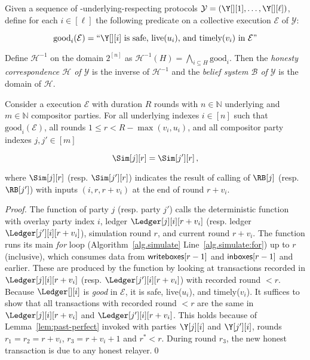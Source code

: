 \begin{definition}
  Given a sequence of \rollerblade-underlying-respecting
  protocols $\mathcal{Y} = (\Y[][1], \ldots, \Y[][\ell])$,
  define for each $i \in [\ell]$ the following predicate on
  a collective execution $\mathcal{E}$ of $\mathcal{Y}$:

  \[
    \text{good}_i(\mathcal{E}) = \text{``} \Y[][i] \text{ is safe, live$(u_i)$, and timely$(v_i)$ in $\mathcal{E}$''}
  \]

  Define $\mathcal{H}^{-1}$ on the domain $2^{[n]}$ as
  $\mathcal{H}^{-1}(H) = \bigwedge_{i \subseteq H} \text{good}_i$.
  Then the \emph{\rollerblade honesty correspondence $\mathcal{H}$ of $\mathcal{Y}$}
  is the inverse of $\mathcal{H}^{-1}$ and the \emph{\rollerblade belief system
  $\mathcal{B}$ of $\mathcal{Y}$} is the domain of $\mathcal{H}$.
\end{definition}

\begin{lemma}\label{lem:cross-party}
  Consider a \rollerblade execution $\mathcal{E}$ with duration $R$ rounds
  with $n \in \mathbb{N}$ underlying
  and $m \in \mathbb{N}$ compositor parties.
  For
  all underlying indexes $i \in [n]$ such that $\text{good}_i(\mathcal{E})$,
  all rounds $1 \leq r < R - \max(v_i, u_i)$,
  and
  all compositor party indexes $j, j' \in [m]$

  \[
    \Sim[j][r] = \Sim[j'][r]\,,
  \]

  where $\Sim[j][r]$ (resp. $\Sim[j'][r]$) indicates the result of calling
  \emulateMachine of $\RB[j]$ (resp. $\RB[j']$) with inputs
  $(i, r, r + v_i)$
  at the end of round $r + v_i$.
\end{lemma}
\begin{proof}
  The function \emulateMachine of party $j$ (resp. party $j'$)
  calls the deterministic function \simulate with overlay party index $i$,
  ledger $\Ledger[j][i][r + v_i]$ (resp. ledger $\Ledger[j'][i][r + v_i]$), simulation round
  $r$, and current round $r + v_i$. The function \simulate runs its main
  \emph{for} loop (Algorithm~\ref{alg.simulate} Line~\ref{alg.simulate:for})
  up to $r$ (inclusive), which consumes data from $\textsf{writeboxes}[r - 1]$
  and $\textsf{inboxes}[r - 1]$ and earlier. These are produced by the function
  \prepareSimulationInputs by looking at transactions recorded in $\Ledger[j][i][r + v_i]$
  (resp. $\Ledger[j'][i][r + v_i]$) with recorded round $< r$.
  Because $\Ledger[][i]$ is \emph{good} in $\mathcal{E}$, it is safe, live($u_i$), and timely($v_i$).
  It suffices to show that all transactions with recorded round
  $< r$ are the same in $\Ledger[j][i][r + v_i]$ and $\Ledger[j'][i][r + v_i]$.
  This holds because of Lemma~\ref{lem:past-perfect} invoked with parties $\Y[j][i]$ and $\Y[j'][i]$,
  rounds $r_1 = r_2 = r + v_i$, $r_3 = r + v_i + 1$ and $r^* < r$.
  During round $r_3$, the new honest transaction is due to any honest
  relayer.\qed
\end{proof}

